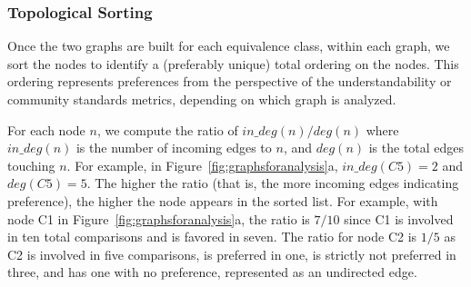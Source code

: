 \subsubsection{Topological Sorting}
Once the two graphs are built for each equivalence class, within each graph, we sort the nodes to identify a (preferably unique) total ordering on the nodes. This ordering represents preferences from the perspective of the understandability or community standards metrics, depending on which graph is analyzed.  

For each node $n$, we compute the ratio of $in\_deg(n) / deg(n)$ where $in\_deg(n)$ is the number of incoming edges to $n$, and $deg(n)$ is the total edges touching $n$. For example, in Figure~\ref{fig:graphsforanalysis}a, $in\_deg(C5) = 2$ and $deg(C5) = 5$. 
The higher the ratio (that is, the more incoming edges indicating preference), the higher the node appears in the sorted list. For example, with node C1 in Figure~\ref{fig:graphsforanalysis}a, the ratio is $7 / 10$ since C1 is involved in ten total comparisons and is favored in seven. The ratio for node C2 is $1 / 5$ as C2 is involved in five comparisons, is preferred in one, is strictly not preferred in three, and has one with no preference, represented as an undirected edge. 


